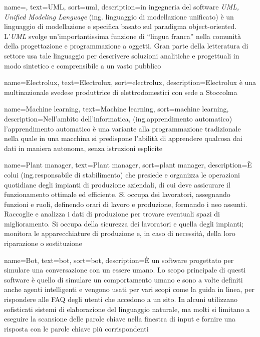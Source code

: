 {
    name=,
    text=UML,
    sort=uml,
    description={in ingegneria del software \emph{UML, Unified Modeling Language} (ing. linguaggio di modellazione unificato) è un linguaggio di modellazione e specifica basato sul paradigma object-oriented. L'\emph{UML} svolge un'importantissima funzione di ``lingua franca'' nella comunità della progettazione e programmazione a oggetti. Gran parte della letteratura di settore usa tale linguaggio per descrivere soluzioni analitiche e progettuali in modo sintetico e comprensibile a un vasto pubblico}
}

{
	name={Electrolux},
	text=Electrolux,
	sort=electrolux,
	description={Electrolux è una multinazionale svedese produttrice di elettrodomestici con sede a Stoccolma}
}

{
	name={Machine learning},
	text=Machine learning,
	sort=machine learning,
	description={Nell'ambito dell'informatica, (ing.apprendimento automatico) l'apprendimento automatico è una variante alla programmazione tradizionale nella quale in una macchina si predispone l'abilità di apprendere qualcosa dai dati in maniera autonoma, senza istruzioni esplicite}
}

{
	name={Plant manager},
	text=Plant manager,
	sort=plant manager,
	description={È colui (ing.responsabile di stabilimento) che presiede e organizza le operazioni quotidiane degli impianti di produzione aziendali, di cui deve assicurare il funzionamento ottimale ed efficiente. Si occupa dei lavoratori, assegnando funzioni e ruoli, definendo orari di lavoro e produzione, formando i neo assunti. Raccoglie e analizza i dati di produzione per trovare eventuali spazi di miglioramento. Si occupa della sicurezza dei lavoratori e quella degli impianti; monitora le apparecchiature di produzione e, in caso di necessità, della loro riparazione o sostituzione}
}

{
	name={Bot},
	text=bot,
	sort=bot,
	description={È un software progettato per simulare una conversazione con un essere umano. Lo scopo principale di questi software è quello di simulare un comportamento umano e sono a volte definiti anche agenti intelligenti e vengono usati per vari scopi come la guida in linea, per rispondere alle FAQ degli utenti che accedono a un sito. In alcuni utilizzano sofisticati sistemi di elaborazione del linguaggio naturale, ma molti si limitano a eseguire la scansione delle parole chiave nella finestra di input e fornire una risposta con le parole chiave più corrispondenti}
}

